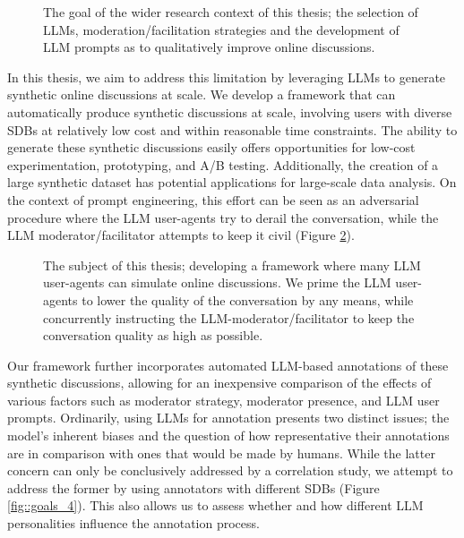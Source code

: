 \begin{figure}
	\centering
	
	\caption{The goal of the wider research context of this thesis; the selection of LLMs, moderation/facilitation strategies and the development of LLM prompts as to qualitatively improve online discussions.}
	\label{fig::goals_2}
\end{figure}

In this thesis, we aim to address this limitation by leveraging \acp{LLM} to generate synthetic online discussions at scale. We develop a framework that can automatically produce synthetic discussions at scale, involving users with diverse \acp{SDB} at relatively low cost and within reasonable time constraints. The ability to generate these synthetic discussions easily offers opportunities for low-cost experimentation, prototyping, and A/B testing. Additionally, the creation of a large synthetic dataset has potential applications for large-scale data analysis. On the context of prompt engineering, this effort can be seen as an adversarial procedure where the LLM user-agents try to derail the conversation, while the LLM moderator/facilitator attempts to keep it civil (Figure \ref{fig::goals_3}).

\begin{figure}
	\centering
	
	\caption{The subject of this thesis; developing a framework where many LLM user-agents can simulate online discussions. We prime the LLM user-agents to lower the quality of the conversation by any means, while concurrently instructing the LLM-moderator/facilitator to keep the conversation quality as high as possible.}
	\label{fig::goals_3}
\end{figure}

Our framework further incorporates automated LLM-based annotations of these synthetic discussions, allowing for an inexpensive comparison of the effects of various factors such as moderator strategy, moderator presence, and LLM user prompts. Ordinarily, using LLMs for annotation presents two distinct issues; the model's inherent biases and the question of how representative their annotations are in comparison with ones that would be made by humans. While the latter concern can only be conclusively addressed by a correlation study, we attempt to address the former by using annotators with different \acp{SDB} (Figure \ref{fig::goals_4}). This also allows us to assess whether and how different LLM personalities influence the annotation process. 

